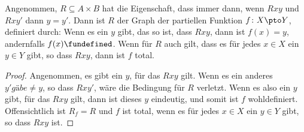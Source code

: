 \documentclass[../../../include/open-logic-section]{subfiles}
\begin{document}
\begin{prop}
Angenommen, $R \subseteq A \times B$ hat die Eigenschaft, dass immer dann, wenn $Rxy$
und $Rxy'$ dann $y = y'$.  Dann ist $R$ der Graph der partiellen
Funktion $f\colon X \pto Y$, definiert durch: Wenn es ein $y$ gibt, das so ist, dass
$Rxy$, dann ist $f(x) = y$, andernfalls $f(x) \fundefined$.  Wenn für $R$ auch gilt,
dass es für jedes $x \in X$ ein $y \in Y$ gibt, so dass
$Rxy$, dann ist $f$ total.
\end{prop}

\begin{proof}
Angenommen, es gibt ein $y$, für das $Rxy$ gilt.  Wenn es ein anderes $y' gäbe
\neq y$, so dass $Rxy'$, wäre die Bedingung für $R$
verletzt. Wenn es also ein $y$ gibt, für das $Rxy$ gilt, dann ist dieses $y$
eindeutig, und somit ist $f$ wohldefiniert.  Offensichtlich ist $R_f = R$ und $f$ ist
total, wenn es für jedes $x \in X$ ein $y \in Y$ gibt, so dass
$Rxy$ ist.
\end{proof}
\end{document}
